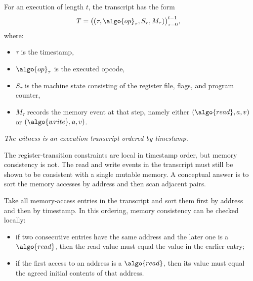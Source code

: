 \documentclass[11pt]{article}
\begin{document}
\begin{definition}
For an execution of length $t$, the transcript has the form
\[
  T = \bigl((\tau, \algo{op}_\tau, S_\tau, M_\tau)\bigr)_{\tau=0}^{t-1},
\]
where:
\begin{itemize}
  \item $\tau$ is the timestamp,
  \item $\algo{op}_\tau$ is the executed opcode,
  \item $S_\tau$ is the machine state consisting of the register file, flags,
        and program counter,
  \item $M_\tau$ records the memory event at that step, namely either
        $(\algo{read}, a, v)$ or $(\algo{write}, a, v)$.
\end{itemize}
\end{definition}

\begin{center}

\smallskip
\emph{The witness is an execution transcript ordered by timestamp.}
\end{center}

The register-transition constraints are local in timestamp order, but memory
consistency is not.  The read and write events in the transcript must still be
shown to be consistent with a single mutable memory.  A conceptual answer is to
sort the memory accesses by address and then scan adjacent pairs.

\begin{proposition}
Take all memory-access entries in the transcript and sort them first by
address and then by timestamp.  In this ordering, memory consistency can be
checked locally:
\begin{itemize}
  \item if two consecutive entries have the same address and the later one is
        a $\algo{read}$, then the read value must equal the value in the
        earlier entry;
  \item if the first access to an address is a $\algo{read}$, then its value
        must equal the agreed initial contents of that address.
\end{itemize}
\end{proposition}
\end{document}

